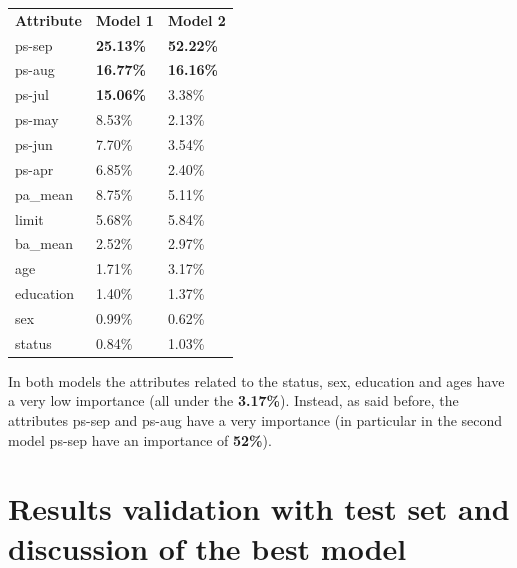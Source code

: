 \begin{table}[h]
\centering
\begin{adjustbox}{width=.3\textwidth}
\small
\begin{tabular}{lll}
\textbf{Attribute}  & \textbf{Model 1} & \textbf{Model 2} \\ \rowcolor[HTML]{EFEFEF} 
 ps-sep             &  \textbf{25.13\%}       & \textbf{52.22\%}        \\
 ps-aug             &  \textbf{16.77\%}       & \textbf{16.16\%}        \\ \rowcolor[HTML]{EFEFEF} 
 ps-jul             &  \textbf{15.06\%}       & {3.38\%}         \\
 ps-may             &  {8.53\%}        & {2.13\%}         \\ \rowcolor[HTML]{EFEFEF} 
 ps-jun             &  {7.70\%}        & {3.54\%}         \\
 ps-apr             &  {6.85\%}        & {2.40\%}         \\ \rowcolor[HTML]{EFEFEF} 
 pa\_mean           &  {8.75\%}        & {5.11\%}         \\
 limit              &  {5.68\%}        & {5.84\%}         \\ \rowcolor[HTML]{EFEFEF} 
 ba\_mean           &  {2.52\%}        & {2.97\%}         \\
 age                &  {1.71\%}        & {3.17\%}         \\ \rowcolor[HTML]{EFEFEF} 
 education          &  {1.40\%}        & {1.37\%}         \\
 sex                &  {0.99\%}        & {0.62\%}         \\ \rowcolor[HTML]{EFEFEF} 
 status             &  {0.84\%}        & {1.03\%}         \\
\end{tabular}
\end{adjustbox}
\end{table}

In both models the attributes related to the status, sex, education and ages have a very low importance (all under the \textbf{3.17\%}). Instead, as said before, the attributes ps-sep and ps-aug have a very importance (in particular in the second model ps-sep have an importance of \textbf{52\%}).

\section{Results validation with test set and discussion of the best model}

